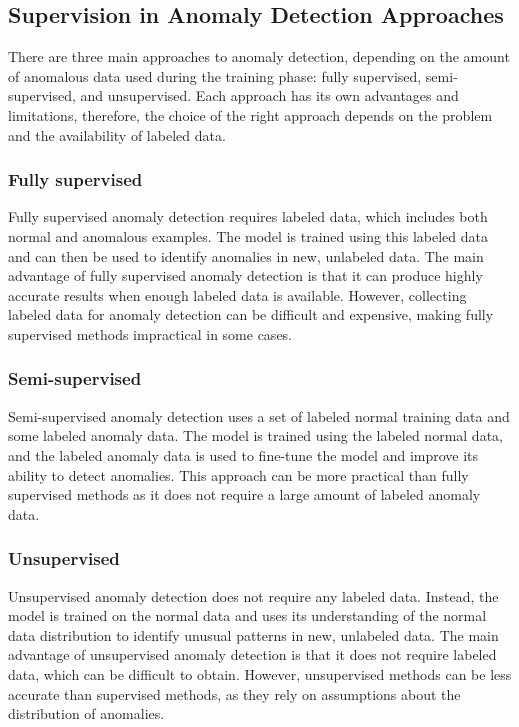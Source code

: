 \subsection{Supervision in Anomaly Detection Approaches}
There are three main approaches to anomaly detection, depending on the amount of anomalous data used during the training phase: fully supervised, semi-supervised, and unsupervised.
Each approach has its own advantages and limitations, therefore, the choice of the right approach depends on the problem and the availability of labeled data.

\subsubsection{Fully supervised}
Fully supervised anomaly detection requires labeled data, which includes both normal and anomalous examples. The model is trained using this labeled data and can then be used to identify anomalies in new, unlabeled data. The main advantage of fully supervised anomaly detection is that it can produce highly accurate results when enough labeled data is available. However, collecting labeled data for anomaly detection can be difficult and expensive, making fully supervised methods impractical in some cases.

\subsubsection{Semi-supervised}
Semi-supervised anomaly detection uses a set of labeled normal training data and some labeled anomaly data. The model is trained using the labeled normal data, and the labeled anomaly data is used to fine-tune the model and improve its ability to detect anomalies. This approach can be more practical than fully supervised methods as it does not require a large amount of labeled anomaly data.

\subsubsection{Unsupervised}
Unsupervised anomaly detection does not require any labeled data. Instead, the model is trained on the normal data and uses its understanding of the normal data distribution to identify unusual patterns in new, unlabeled data. The main advantage of unsupervised anomaly detection is that it does not require labeled data, which can be difficult to obtain. However, unsupervised methods can be less accurate than supervised methods, as they rely on assumptions about the distribution of anomalies.


